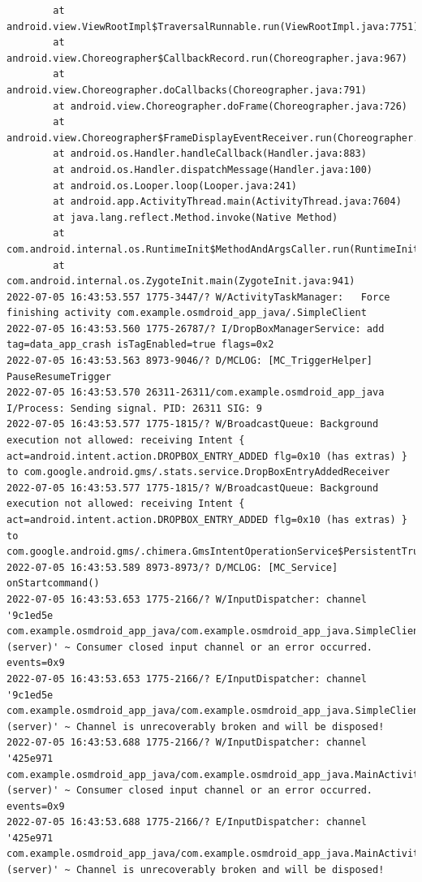 \documentclass[a4paper,12pt]{book}
\begin{document}
\begin{lstlisting}
        at android.view.ViewRootImpl$TraversalRunnable.run(ViewRootImpl.java:7751)
        at android.view.Choreographer$CallbackRecord.run(Choreographer.java:967)
        at android.view.Choreographer.doCallbacks(Choreographer.java:791)
        at android.view.Choreographer.doFrame(Choreographer.java:726)
        at android.view.Choreographer$FrameDisplayEventReceiver.run(Choreographer.java:952)
        at android.os.Handler.handleCallback(Handler.java:883)
        at android.os.Handler.dispatchMessage(Handler.java:100)
        at android.os.Looper.loop(Looper.java:241)
        at android.app.ActivityThread.main(ActivityThread.java:7604)
        at java.lang.reflect.Method.invoke(Native Method)
        at com.android.internal.os.RuntimeInit$MethodAndArgsCaller.run(RuntimeInit.java:492)
        at com.android.internal.os.ZygoteInit.main(ZygoteInit.java:941)
2022-07-05 16:43:53.557 1775-3447/? W/ActivityTaskManager:   Force finishing activity com.example.osmdroid_app_java/.SimpleClient
2022-07-05 16:43:53.560 1775-26787/? I/DropBoxManagerService: add tag=data_app_crash isTagEnabled=true flags=0x2
2022-07-05 16:43:53.563 8973-9046/? D/MCLOG: [MC_TriggerHelper] PauseResumeTrigger
2022-07-05 16:43:53.570 26311-26311/com.example.osmdroid_app_java I/Process: Sending signal. PID: 26311 SIG: 9
2022-07-05 16:43:53.577 1775-1815/? W/BroadcastQueue: Background execution not allowed: receiving Intent { act=android.intent.action.DROPBOX_ENTRY_ADDED flg=0x10 (has extras) } to com.google.android.gms/.stats.service.DropBoxEntryAddedReceiver
2022-07-05 16:43:53.577 1775-1815/? W/BroadcastQueue: Background execution not allowed: receiving Intent { act=android.intent.action.DROPBOX_ENTRY_ADDED flg=0x10 (has extras) } to com.google.android.gms/.chimera.GmsIntentOperationService$PersistentTrustedReceiver
2022-07-05 16:43:53.589 8973-8973/? D/MCLOG: [MC_Service] onStartcommand()
2022-07-05 16:43:53.653 1775-2166/? W/InputDispatcher: channel '9c1ed5e com.example.osmdroid_app_java/com.example.osmdroid_app_java.SimpleClient (server)' ~ Consumer closed input channel or an error occurred.  events=0x9
2022-07-05 16:43:53.653 1775-2166/? E/InputDispatcher: channel '9c1ed5e com.example.osmdroid_app_java/com.example.osmdroid_app_java.SimpleClient (server)' ~ Channel is unrecoverably broken and will be disposed!
2022-07-05 16:43:53.688 1775-2166/? W/InputDispatcher: channel '425e971 com.example.osmdroid_app_java/com.example.osmdroid_app_java.MainActivity (server)' ~ Consumer closed input channel or an error occurred.  events=0x9
2022-07-05 16:43:53.688 1775-2166/? E/InputDispatcher: channel '425e971 com.example.osmdroid_app_java/com.example.osmdroid_app_java.MainActivity (server)' ~ Channel is unrecoverably broken and will be disposed!

\end{lstlisting}
\end{document}

